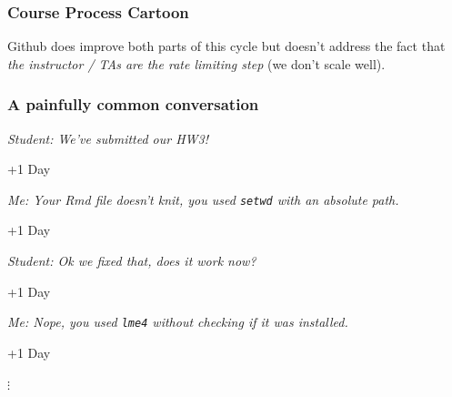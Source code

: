 \documentclass[12pt]{beamer}
\begin{document}
\begin{frame}
\frametitle{Course Process Cartoon}

\vspace{-7mm}

\begin{center}
\end{center}

\pause

Github does improve both parts of this cycle \pause but doesn't address the fact that \emph{the instructor / TAs are the rate limiting step} (we don't scale well).

\end{frame}


\begin{frame}[fragile]
\frametitle{A painfully common conversation}

\vspace{-7mm}

{\footnotesize
\textit{Student: We've submitted our HW3!}
%
\begin{center} +1 Day \end{center}
%
\textit{Me: Your Rmd file doesn't knit, you used \texttt{setwd} with an absolute path.}
%
\begin{center} +1 Day \end{center}
%
\textit{Student: Ok we fixed that, does it work now?}
%
\begin{center} +1 Day \end{center}
%
\textit{Me: Nope, you used \texttt{lme4} without checking if it was installed.}
%
\begin{center} +1 Day \end{center}
%
\begin{center} $\vdots$ \end{center}
}
\end{frame}
\end{document}
